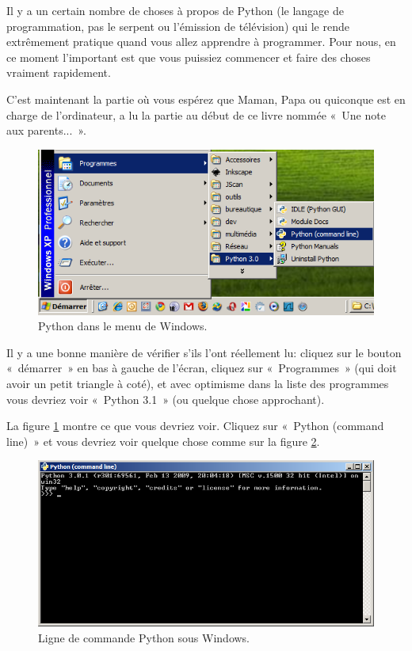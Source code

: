 Il y a un certain nombre de choses à propos de Python (le langage de programmation, pas le serpent ou l'émission de télévision) qui le rende extrêmement pratique quand vous allez apprendre à programmer. Pour nous, en ce moment l'important est que vous puissiez commencer et faire des choses vraiment rapidement.

C'est maintenant la partie où vous espérez que Maman, Papa ou quiconque est en charge de l'ordinateur, a lu la partie au début de ce livre nommée «~Une note aux parents...~».

\begin{figure}[!ht]
\capstart
\centering
\includegraphics[scale=0.6]{images/startmenu}
\caption{Python dans le menu de Windows.}\label{fig:startmenu}
\end{figure}

Il y a une bonne manière de vérifier s'ils l'ont réellement lu: cliquez sur le bouton «~démarrer~» en bas à gauche de l'écran, cliquez sur «~Programmes~» (qui doit avoir un petit triangle à coté), et avec optimisme dans la liste des programmes vous devriez voir «~Python 3.1~» (ou quelque chose approchant).
 
La figure \ref{fig:startmenu} montre ce que vous devriez voir. Cliquez sur «~Python (command line)~» et vous devriez voir quelque chose comme sur la figure \ref{fig:pycl}.

\begin{figure}[!ht]
\centering
\includegraphics[scale=0.6]{images/pycl}
\caption{Ligne de commande Python sous Windows.}\label{fig:pycl}
\end{figure}

